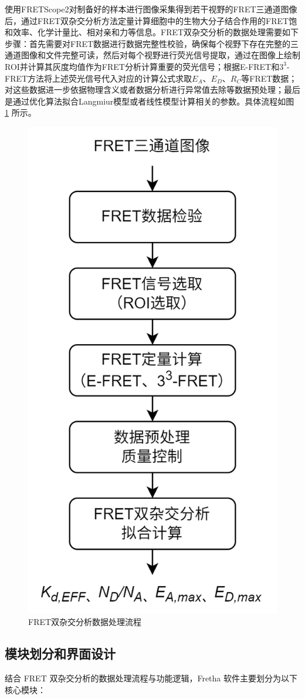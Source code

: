 使用FRETScope2对制备好的样本进行图像采集得到若干视野的FRET三通道图像后，通过FRET双杂交分析方法定量计算细胞中的生物大分子结合作用的FRET饱和效率、化学计量比、相对亲和力等信息。FRET双杂交分析的数据处理需要如下步骤：首先需要对FRET数据进行数据完整性校验，确保每个视野下存在完整的三通道图像和文件完整可读，然后对每个视野进行荧光信号提取，通过在图像上绘制ROI并计算其灰度均值作为FRET分析计算重要的荧光信号；根据E-FRET和$3^3$-FRET方法将上述荧光信号代入对应的计算公式求取$E_A$、$E_D$、$R_C$等FRET数据；对这些数据进一步依据物理含义或者数据分析进行异常值去除等数据预处理；最后是通过优化算法拟合Langmiur模型或者线性模型计算相关的参数。具体流程如图 \ref{fig:tha_data_process} 所示。

\begin{figure}[hbtp]
    \centering
    \includegraphics[width=0.4\linewidth]{../figures/2/2_FRET双杂交分析数据处理流程.png}
    \caption{FRET双杂交分析数据处理流程}
    \label{fig:tha_data_process}
\end{figure}

\fi

\subsection{模块划分和界面设计}

结合 FRET 双杂交分析的数据处理流程与功能逻辑，Fretha 软件主要划分为以下核心模块：

